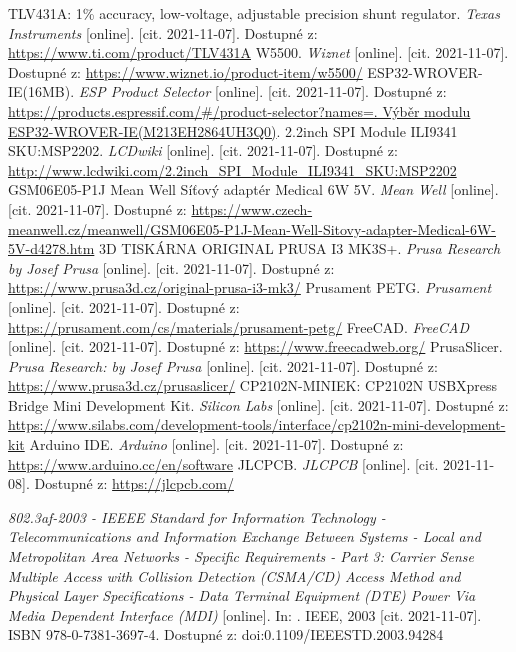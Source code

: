 \begin{thebibliography}{3}
TLV431A: 1\% accuracy, low-voltage, adjustable precision shunt regulator. \textit{Texas Instruments} [online]. [cit. 2021-11-07]. Dostupné z: \url{https://www.ti.com/product/TLV431A}
W5500. \textit{Wiznet} [online]. [cit. 2021-11-07]. Dostupné z: \url{https://www.wiznet.io/product-item/w5500/}
ESP32-WROVER-IE(16MB). \textit{ESP Product Selector} [online]. [cit. 2021-11-07]. Dostupné z: \url{https://products.espressif.com/#/product-selector?names=. Výběr modulu ESP32-WROVER-IE(M213EH2864UH3Q0)}.
2.2inch SPI Module ILI9341 SKU:MSP2202. \textit{LCDwiki} [online]. [cit. 2021-11-07]. Dostupné z:  \url{http://www.lcdwiki.com/2.2inch_SPI_Module_ILI9341_SKU:MSP2202}
GSM06E05-P1J Mean Well Síťový adaptér Medical 6W 5V. \textit{Mean Well} [online]. [cit. 2021-11-07]. Dostupné z:  \url{https://www.czech-meanwell.cz/meanwell/GSM06E05-P1J-Mean-Well-Sitovy-adapter-Medical-6W-5V-d4278.htm}
3D TISKÁRNA ORIGINAL PRUSA I3 MK3S+. \textit{Prusa Research by Josef Prusa} [online]. [cit. 2021-11-07]. Dostupné z:  \url{https://www.prusa3d.cz/original-prusa-i3-mk3/}
Prusament PETG. \textit{Prusament} [online]. [cit. 2021-11-07]. Dostupné z: \url{https://prusament.com/cs/materials/prusament-petg/}
FreeCAD. \textit{FreeCAD} [online]. [cit. 2021-11-07]. Dostupné z: \url{https://www.freecadweb.org/}
PrusaSlicer. \textit{Prusa Research: by Josef Prusa} [online]. [cit. 2021-11-07]. Dostupné z: \url{https://www.prusa3d.cz/prusaslicer/}
CP2102N-MINIEK: CP2102N USBXpress Bridge Mini Development Kit. \textit{Silicon Labs} [online]. [cit. 2021-11-07]. Dostupné z: \url{https://www.silabs.com/development-tools/interface/cp2102n-mini-development-kit}
Arduino IDE. \textit{Arduino} [online]. [cit. 2021-11-07]. Dostupné z: \url{https://www.arduino.cc/en/software}
JLCPCB. \textit{JLCPCB} [online]. [cit. 2021-11-08]. Dostupné z: \url{https://jlcpcb.com/}

\textit{802.3af-2003 - IEEEE Standard for Information Technology - Telecommunications and Information Exchange Between Systems - Local and Metropolitan Area Networks - Specific Requirements - Part 3: Carrier Sense Multiple Access with Collision Detection (CSMA/CD) Access Method and Physical Layer Specifications - Data Terminal Equipment (DTE) Power Via Media Dependent Interface (MDI)} [online]. In: . IEEE, 2003 [cit. 2021-11-07]. ISBN 978-0-7381-3697-4. Dostupné z: doi:0.1109/IEEESTD.2003.94284


\end{thebibliography}
